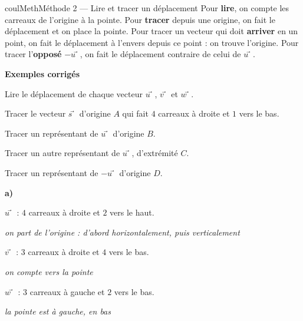 \documentclass[11pt,a4paper]{article}
\makeatletter
\newcommand{\quadrillage}[4]{\draw[grille,step=1] (#1,#2) grid (#3,#4);}
\newcommand{\pt}[3]{\path (#1) node[croix]{} node[#2,font=\small,inner sep=2.5pt]{$#3$};}
\newcounter{lycee@signet}
\newcommand{\signet}[3][]{\stepcounter{lycee@signet}%
  \edef\lycee@dest{\if\relax\detokenize{#1}\relax
    signet.\arabic{lycee@signet}\else#1\fi}%
  \hypertarget{\lycee@dest}{}\bookmark[level=#2,dest=\lycee@dest]{#3}}
\def\vec#1{#1⃗}}%
\newcommand{\res}[1]{#1}
\newcounter{methode}
\newenvironment{methodebox}[1][Méthode]{\stepcounter{methode}%
  \begin{boitecours}[phantom={\signet[methode-\arabic{methode}]{2}{#1}}]{coulMeth}{#1}}%
  {\end{boitecours}}
\newcommand{\etape}[1]{\par\smallskip\textbf{\color{coulMeth}#1}\par\nobreak\smallskip}
\newcommand{\explique}[2]{\par\smallskip\noindent
  \begin{minipage}[t]{0.57\linewidth}\raggedright #1\end{minipage}\hfill
  \begin{minipage}[t]{0.40\linewidth}\raggedright\leavevmode
    {\small\itshape\color{black!60}#2}\end{minipage}\par}
\newcommand{\cas}[1]{\par\smallskip\noindent\textbf{\color{coulExo}#1}\vadjust{\nobreak}}
\newenvironment{correction}{\par}{\par}
\newcommand{\etapeexemples}{\etape{Exemples corrigés}}
\makeatother
\begin{document}
\begin{methodebox}[Méthode 2 --- Lire et tracer un déplacement]
Pour \textbf{lire}, on compte les carreaux de l'origine à la pointe. Pour \textbf{tracer}
depuis une origine, on fait le déplacement et on place la pointe. Pour tracer un vecteur
qui doit \textbf{arriver} en un point, on fait le déplacement à l'envers depuis ce point :
on trouve l'origine. Pour tracer l'\textbf{opposé} $-\vec{u}$, on fait le déplacement
contraire de celui de $\vec{u}$.
\etapeexemples
\begin{questions}[label=\alph*)]
  \item Lire le déplacement de chaque vecteur $\vec{u}$, $\vec{v}$ et $\vec{w}$.
  \item Tracer le vecteur $\vec{s}$ d'origine $A$ qui fait $4$ carreaux à droite et $1$
        vers le bas.
  \item Tracer un représentant de $\vec{u}$ d'origine $B$.
  \item Tracer un autre représentant de $\vec{u}$, d'extrémité $C$.
  \item Tracer un représentant de $-\vec{u}$ d'origine $D$.
\end{questions}
\begin{center}
\quad
{}
\end{center}
\begin{correction}
\cas{a)}\par\nopagebreak
\explique{$\vec{u}$ : \res{$4$ carreaux à droite et $2$ vers le haut}.}{on part de l'origine :
d'abord horizontalement, puis verticalement}
\explique{$\vec{v}$ : \res{$3$ carreaux à droite et $4$ vers le bas}.}{on compte vers la pointe}
\explique{$\vec{w}$ : \res{$3$ carreaux à gauche et $2$ vers le bas}.}{la pointe est à gauche,
en bas}


\end{correction}
\end{methodebox}
\end{document}
